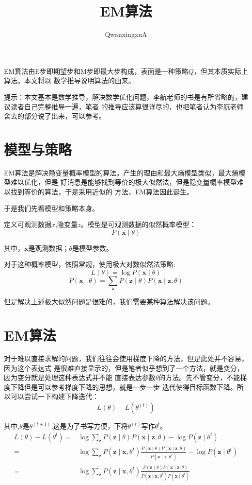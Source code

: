 \documentclass{article}
\title{EM算法}
\author{QwanxingxuA}
\begin{document}
\maketitle
    EM算法由E步即期望步和M步即最大步构成，表面是一种策略$Q$，但其本质实际上算法。本文将以
    数学推导说明算法的由来。

    提示：本文基本是数学推导，解决数学优化问题，李航老师的书是有所省略的，建议读者自己完整推导一遍，笔者
    的推导应该算很详尽的，也把笔者认为李航老师舍去的部分说了出来，可以参考。
    \section{模型与策略}
        EM算法是解决隐变量概率模型的算法。产生的理由和最大熵模型类似，最大熵模型难以优化，但是
        好消息是能够找到等价的极大似然法，但是隐变量概率模型难以找到等价的算法，于是采用近似的
        方法，EM算法因此诞生。

        于是我们先看模型和策略本身。
        
        定义可观测数据$x$,隐变量$z$。模型是可观测数据的似然概率模型：
        \[P(\boldsymbol{x}\mid \theta)\]

        其中，$\boldsymbol{x}$是观测数据；$\theta$是模型参数。

        对于这种概率模型，依照常规，使用极大对数似然法策略:
        \[L(\theta)=\log P(\boldsymbol{x}\mid\theta)\]
        \[P(\boldsymbol{x}\mid \theta)=\sum_{\boldsymbol{z}}P(\boldsymbol{z}\mid \theta)P(\boldsymbol{x}\mid\boldsymbol{z},\theta)\]

        但是解决上述极大似然问题是很难的，我们需要某种算法解决该问题。

    \section{EM算法}
        对于难以直接求解的问题，我们往往会使用梯度下降的方法，但是此处并不容易，因为这个表达式
        是很难直接显示的，但是笔者似乎想到了一个方法，就是变分，因为变分就是处理这种表达式并不能
        直接表达参数$\theta$的方法。先不管变分，不能梯度下降但是可以参考梯度下降的思想，就是一步一步
        迭代使得目标函数下降。所以可以尝试一下构建下降迭代：
        \[L(\theta)-L(\theta^{(t)})\]
        
        其中,$\theta$是$\theta^{(t+1)}$,这是为了书写方便，下将$\theta^{(t)}$写作$\theta^t$。
        \begin{align*}
            L(\theta)-L(\theta^t)=&\log \sum_{\boldsymbol{z}}P(\boldsymbol{z}\mid \theta)P(\boldsymbol{x}\mid\boldsymbol{z},\theta)-\log P(\boldsymbol{z}\mid\theta^t)\\
            = &\log \sum_{\boldsymbol{z}}P(\boldsymbol{z}\mid\boldsymbol{x},\theta^t)\frac{P(\boldsymbol{z}\mid \theta)P(\boldsymbol{x}\mid\boldsymbol{z},\theta)}{P(\boldsymbol{z}\mid\boldsymbol{x},\theta^t)}-\log P(\boldsymbol{z}\mid\theta^t)\\
            =&\log \sum_{\boldsymbol{z}}P(\boldsymbol{z}\mid\boldsymbol{x},\theta^t)\frac{P(\boldsymbol{z}\mid \theta)P(\boldsymbol{x}\mid\boldsymbol{z},\theta)}{P(\boldsymbol{z}\mid\boldsymbol{x},\theta^t)P(\boldsymbol{x}\mid \theta^t)}
        \end{align*}
\end{document}
